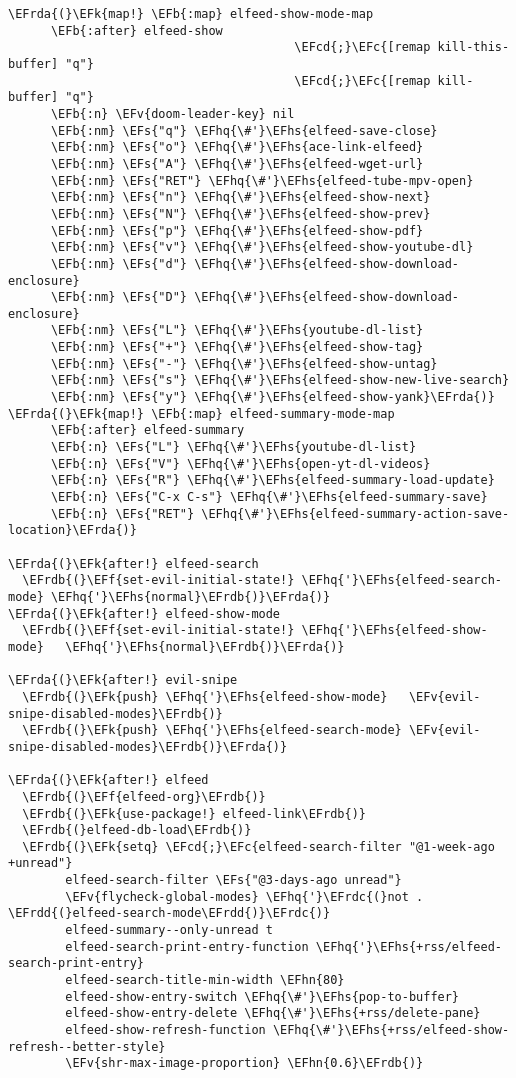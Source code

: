 \documentclass[a4wide,10pt]{article}
\newcommand{\EFc}[1]{\textcolor{EFc}{#1}} %
\newcommand{\EFcd}[1]{\textcolor{EFcd}{#1}} %
\newcommand{\EFs}[1]{\textcolor{EFs}{#1}} %
\newcommand{\EFk}[1]{\textcolor{EFk}{#1}} %
\newcommand{\EFb}[1]{\textcolor{EFb}{#1}} %
\newcommand{\EFf}[1]{\textcolor{EFf}{#1}} %
\newcommand{\EFv}[1]{\textcolor{EFv}{#1}} %
\newcommand{\EFhn}[1]{\textcolor{EFhn}{\textbf{#1}}} %
\newcommand{\EFhq}[1]{\textcolor{EFhq}{#1}} %
\newcommand{\EFhs}[1]{\textcolor{EFhs}{#1}} %
\newcommand{\EFrda}[1]{\textcolor{EFrda}{#1}} %
\newcommand{\EFrdb}[1]{\textcolor{EFrdb}{#1}} %
\newcommand{\EFrdc}[1]{\textcolor{EFrdc}{#1}} %
\newcommand{\EFrdd}[1]{\textcolor{EFrdd}{#1}} %
\begin{document}
\begin{Code}
\begin{Verbatim}
\EFrda{(}\EFk{map!} \EFb{:map} elfeed-show-mode-map
      \EFb{:after} elfeed-show
                                        \EFcd{;}\EFc{[remap kill-this-buffer] "q"}
                                        \EFcd{;}\EFc{[remap kill-buffer] "q"}
      \EFb{:n} \EFv{doom-leader-key} nil
      \EFb{:nm} \EFs{"q"} \EFhq{\#'}\EFhs{elfeed-save-close}
      \EFb{:nm} \EFs{"o"} \EFhq{\#'}\EFhs{ace-link-elfeed}
      \EFb{:nm} \EFs{"A"} \EFhq{\#'}\EFhs{elfeed-wget-url}
      \EFb{:nm} \EFs{"RET"} \EFhq{\#'}\EFhs{elfeed-tube-mpv-open}
      \EFb{:nm} \EFs{"n"} \EFhq{\#'}\EFhs{elfeed-show-next}
      \EFb{:nm} \EFs{"N"} \EFhq{\#'}\EFhs{elfeed-show-prev}
      \EFb{:nm} \EFs{"p"} \EFhq{\#'}\EFhs{elfeed-show-pdf}
      \EFb{:nm} \EFs{"v"} \EFhq{\#'}\EFhs{elfeed-show-youtube-dl}
      \EFb{:nm} \EFs{"d"} \EFhq{\#'}\EFhs{elfeed-show-download-enclosure}
      \EFb{:nm} \EFs{"D"} \EFhq{\#'}\EFhs{elfeed-show-download-enclosure}
      \EFb{:nm} \EFs{"L"} \EFhq{\#'}\EFhs{youtube-dl-list}
      \EFb{:nm} \EFs{"+"} \EFhq{\#'}\EFhs{elfeed-show-tag}
      \EFb{:nm} \EFs{"-"} \EFhq{\#'}\EFhs{elfeed-show-untag}
      \EFb{:nm} \EFs{"s"} \EFhq{\#'}\EFhs{elfeed-show-new-live-search}
      \EFb{:nm} \EFs{"y"} \EFhq{\#'}\EFhs{elfeed-show-yank}\EFrda{)}
\EFrda{(}\EFk{map!} \EFb{:map} elfeed-summary-mode-map
      \EFb{:after} elfeed-summary
      \EFb{:n} \EFs{"L"} \EFhq{\#'}\EFhs{youtube-dl-list}
      \EFb{:n} \EFs{"V"} \EFhq{\#'}\EFhs{open-yt-dl-videos}
      \EFb{:n} \EFs{"R"} \EFhq{\#'}\EFhs{elfeed-summary-load-update}
      \EFb{:n} \EFs{"C-x C-s"} \EFhq{\#'}\EFhs{elfeed-summary-save}
      \EFb{:n} \EFs{"RET"} \EFhq{\#'}\EFhs{elfeed-summary-action-save-location}\EFrda{)}

\EFrda{(}\EFk{after!} elfeed-search
  \EFrdb{(}\EFf{set-evil-initial-state!} \EFhq{'}\EFhs{elfeed-search-mode} \EFhq{'}\EFhs{normal}\EFrdb{)}\EFrda{)}
\EFrda{(}\EFk{after!} elfeed-show-mode
  \EFrdb{(}\EFf{set-evil-initial-state!} \EFhq{'}\EFhs{elfeed-show-mode}   \EFhq{'}\EFhs{normal}\EFrdb{)}\EFrda{)}

\EFrda{(}\EFk{after!} evil-snipe
  \EFrdb{(}\EFk{push} \EFhq{'}\EFhs{elfeed-show-mode}   \EFv{evil-snipe-disabled-modes}\EFrdb{)}
  \EFrdb{(}\EFk{push} \EFhq{'}\EFhs{elfeed-search-mode} \EFv{evil-snipe-disabled-modes}\EFrdb{)}\EFrda{)}

\EFrda{(}\EFk{after!} elfeed
  \EFrdb{(}\EFf{elfeed-org}\EFrdb{)}
  \EFrdb{(}\EFk{use-package!} elfeed-link\EFrdb{)}
  \EFrdb{(}elfeed-db-load\EFrdb{)}
  \EFrdb{(}\EFk{setq} \EFcd{;}\EFc{elfeed-search-filter "@1-week-ago +unread"}
        elfeed-search-filter \EFs{"@3-days-ago unread"}
        \EFv{flycheck-global-modes} \EFhq{'}\EFrdc{(}not . \EFrdd{(}elfeed-search-mode\EFrdd{)}\EFrdc{)}
        elfeed-summary--only-unread t
        elfeed-search-print-entry-function \EFhq{'}\EFhs{+rss/elfeed-search-print-entry}
        elfeed-search-title-min-width \EFhn{80}
        elfeed-show-entry-switch \EFhq{\#'}\EFhs{pop-to-buffer}
        elfeed-show-entry-delete \EFhq{\#'}\EFhs{+rss/delete-pane}
        elfeed-show-refresh-function \EFhq{\#'}\EFhs{+rss/elfeed-show-refresh--better-style}
        \EFv{shr-max-image-proportion} \EFhn{0.6}\EFrdb{)}


\end{Verbatim}
\end{Code}
\end{document}
